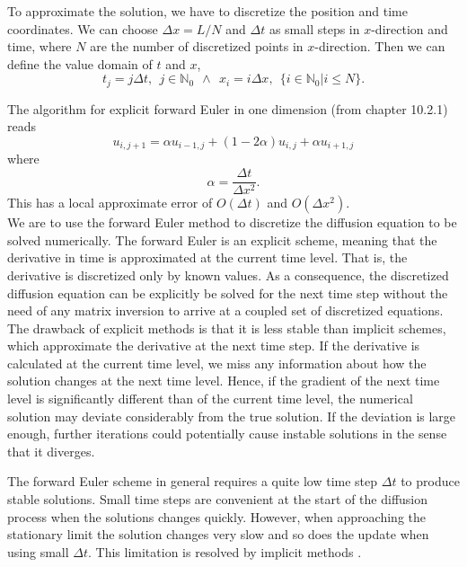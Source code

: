 \documentclass[12pt]{extarticle}
\begin{document}
To approximate the solution, we have to discretize the position and time coordinates. We can choose  $\Delta x = L/N$ and $\Delta t$ as small steps in $x$-direction and time, where $N$ are the number of discretized points in $x$-direction. Then we can define the value domain of $t$ and $x$,
\begin{equation*}
t_j = j\Delta t, \ \ j\in \mathbb{N}_0 \ \ \wedge \ \ x_i = i\Delta x, \ \ \{i \in \mathbb{N}_0 | i \leq N\}.
\end{equation*}

The algorithm for explicit forward Euler in one dimension (from \cite{lectures2015} chapter 10.2.1) reads
\begin{equation}
\label{eq:forward_euler}
u_{i, j+1} = \alpha u_{i-1, j} + (1 - 2\alpha) u_{i,j} + \alpha u_{i+1, j}
\end{equation}
where
\begin{equation*}
\alpha = \frac{\Delta t}{\Delta x^2}.
\end{equation*}
This has a local approximate error of $O(\Delta t)$ and $O(\Delta x ^2)$. \\

We are to use the forward Euler method to discretize the diffusion equation to be solved numerically. The forward Euler is an explicit scheme, meaning that the derivative in time is approximated at the current time level.
That is, the derivative is discretized only by known values. As a consequence, the discretized diffusion equation can be explicitly be solved for the next time step without the need of any matrix inversion to arrive at a coupled
set of discretized equations. The drawback of explicit methods is that it is less stable than implicit schemes, which approximate the derivative at the next time step.
If the derivative is calculated at the current time level, we miss any information about how the solution changes at the next time level. 
Hence, if the gradient of the next time level is significantly different than of the current time level, the numerical solution may deviate considerably from the true solution. 
If the deviation is large enough, further iterations could potentially cause instable solutions in the sense that it diverges.
\par The forward Euler scheme in general requires a quite low time step $\Delta t$ to produce stable solutions. Small time steps are convenient at the start of the diffusion process when the solutions changes quickly. However, when approaching the stationary limit the solution changes very slow and so does the update when using small $\Delta t$. This limitation is resolved by implicit methods \cite{Linge2017}.
\end{document}
